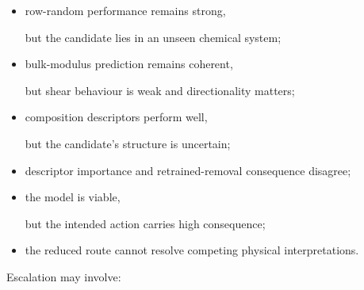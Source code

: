 \documentclass[11pt,a4paper,oneside]{report}
\begin{document}
\begin{itemize}



\item

row-random performance remains strong,

but the candidate lies in an unseen chemical system;



\item

bulk-modulus prediction remains coherent,

but shear behaviour is weak and directionality matters;



\item

composition descriptors perform well,

but the candidate's structure is uncertain;



\item

descriptor importance and retrained-removal consequence disagree;



\item

the model is viable,

but the intended action carries high consequence;



\item

the reduced route cannot resolve competing physical interpretations.



\end{itemize}



Escalation may involve:
\end{document}

